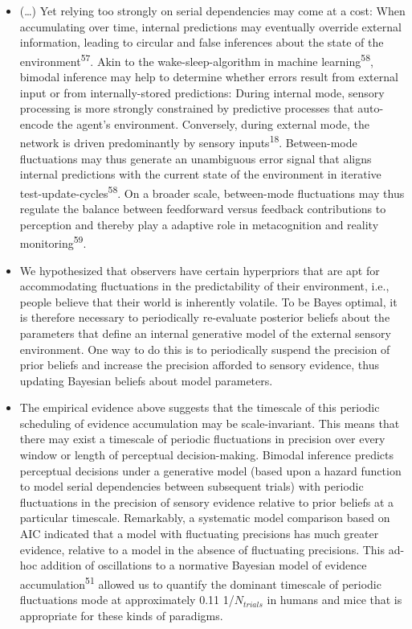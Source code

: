 \documentclass[
]{article}
\begin{document}
\begin{itemize}
\item
  (\ldots) Yet relying too strongly on serial dependencies may come at a
  cost: When accumulating over time, internal predictions may eventually
  override external information, leading to circular and false
  inferences about the state of the environment\textsuperscript{57}.
  Akin to the wake-sleep-algorithm in machine
  learning\textsuperscript{58}, bimodal inference may help to determine
  whether errors result from external input or from internally-stored
  predictions: During internal mode, sensory processing is more strongly
  constrained by predictive processes that auto-encode the agent's
  environment. Conversely, during external mode, the network is driven
  predominantly by sensory inputs\textsuperscript{18}. Between-mode
  fluctuations may thus generate an unambiguous error signal that aligns
  internal predictions with the current state of the environment in
  iterative test-update-cycles\textsuperscript{58}. On a broader scale,
  between-mode fluctuations may thus regulate the balance between
  feedforward versus feedback contributions to perception and thereby
  play a adaptive role in metacognition and reality
  monitoring\textsuperscript{59}.
\item
  We hypothesized that observers have certain hyperpriors that are apt
  for accommodating fluctuations in the predictability of their
  environment, i.e., people believe that their world is inherently
  volatile. To be Bayes optimal, it is therefore necessary to
  periodically re-evaluate posterior beliefs about the parameters that
  define an internal generative model of the external sensory
  environment. One way to do this is to periodically suspend the
  precision of prior beliefs and increase the precision afforded to
  sensory evidence, thus updating Bayesian beliefs about model
  parameters.
\item
  The empirical evidence above suggests that the timescale of this
  periodic scheduling of evidence accumulation may be scale-invariant.
  This means that there may exist a timescale of periodic fluctuations
  in precision over every window or length of perceptual
  decision-making. Bimodal inference predicts perceptual decisions under
  a generative model (based upon a hazard function to model serial
  dependencies between subsequent trials) with periodic fluctuations in
  the precision of sensory evidence relative to prior beliefs at a
  particular timescale. Remarkably, a systematic model comparison based
  on AIC indicated that a model with fluctuating precisions has much
  greater evidence, relative to a model in the absence of fluctuating
  precisions. This ad-hoc addition of oscillations to a normative
  Bayesian model of evidence accumulation\textsuperscript{51} allowed us
  to quantify the dominant timescale of periodic fluctuations mode at
  approximately 0.11 1/\(N_{trials}\) in humans and mice that is
  appropriate for these kinds of paradigms.
\end{itemize}
\end{document}
